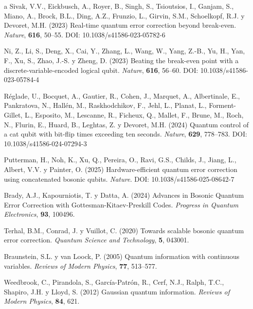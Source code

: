 \documentclass[11pt,a4paper,spanish]{book}
\begin{document}
\begin{thebibliography}{a}
 Sivak, V.V., Eickbusch, A., Royer, B., Singh, S., Tsioutsios, I., Ganjam, S., Miano, A., Brock, B.L., Ding, A.Z., Frunzio, L., Girvin, S.M., Schoelkopf, R.J. y Devoret, M.H. (2023) Real-time quantum error correction beyond break-even. \textit{Nature}, \textbf{616}, 50--55. DOI: 10.1038/s41586-023-05782-6

 Ni, Z., Li, S., Deng, X., Cai, Y., Zhang, L., Wang, W., Yang, Z.-B., Yu, H., Yan, F., Xu, S., Zhao, J.-S. y Zheng, D. (2023) Beating the break-even point with a discrete-variable-encoded logical qubit. \textit{Nature}, \textbf{616}, 56--60. DOI: 10.1038/s41586-023-05784-4

 Réglade, U., Bocquet, A., Gautier, R., Cohen, J., Marquet, A., Albertinale, E., Pankratova, N., Hallén, M., Raskhodchikov, F., Jehl, L., Planat, L., Forment-Gillet, L., Esposito, M., Lescanne, R., Ficheux, Q., Mallet, F., Brune, M., Roch, N., Flurin, E., Huard, B., Leghtas, Z. y Devoret, M.H. (2024) Quantum control of a cat qubit with bit-flip times exceeding ten seconds. \textit{Nature}, \textbf{629}, 778--783. DOI: 10.1038/s41586-024-07294-3

 Putterman, H., Noh, K., Xu, Q., Pereira, O., Ravi, G.S., Childs, J., Jiang, L., Albert, V.V. y Painter, O. (2025) Hardware-efficient quantum error correction using concatenated bosonic qubits. \textit{Nature}. DOI: 10.1038/s41586-025-08642-7

 Brady, A.J., Kapourniotis, T. y Datta, A. (2024) Advances in Bosonic Quantum Error Correction with Gottesman-Kitaev-Preskill Codes. \textit{Progress in Quantum Electronics}, \textbf{93}, 100496.

 Terhal, B.M., Conrad, J. y Vuillot, C. (2020) Towards scalable bosonic quantum error correction. \textit{Quantum Science and Technology}, \textbf{5}, 043001.


 Braunstein, S.L. y van Loock, P. (2005) Quantum information with continuous variables. \textit{Reviews of Modern Physics}, \textbf{77}, 513--577.

 Weedbrook, C., Pirandola, S., García-Patrón, R., Cerf, N.J., Ralph, T.C., Shapiro, J.H. y Lloyd, S. (2012) Gaussian quantum information. \textit{Reviews of Modern Physics}, \textbf{84}, 621.


\end{thebibliography}
\end{document}
